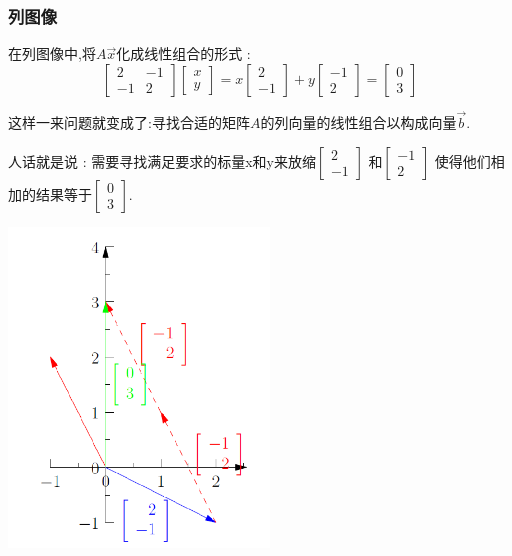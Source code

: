 \documentclass[UTF8,12pt]{ctexbook}
\begin{document}
{{{{\subsubsection{列图像}{
  在列图像中,将$A\vec{x}$化成线性组合的形式 :
  $$
    \begin{bmatrix}
      2  & -1 \\
      -1 & 2
    \end{bmatrix}
    \begin{bmatrix}
      x \\
      y
    \end{bmatrix}
    =
    x\begin{bmatrix}
      2 \\
      -1
    \end{bmatrix}
    +
    y\begin{bmatrix}
      -1 \\
      2
    \end{bmatrix}
    =
    \begin{bmatrix}
      0 \\
      3
    \end{bmatrix}
  $$

  这样一来问题就变成了:寻找合适的矩阵$A$的列向量的线性组合以构成向量$\vec{b}$.

  人话就是说 : 需要寻找满足要求的标量x和y来放缩$\begin{bmatrix}
      2 \\
      -1
    \end{bmatrix}$
  和$\begin{bmatrix}
      -1 \\
      2
    \end{bmatrix}$
  使得他们相加的结果等于$\begin{bmatrix}
      0 \\
      3
    \end{bmatrix}$.

  \begin{multicols}{2}
    \includegraphics{resources/colum_picture_1.png}


\end{multicols}}}}}}
\end{document}
